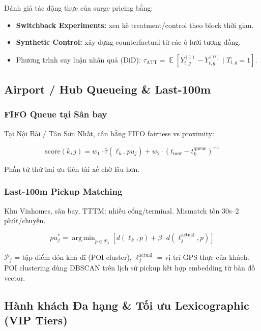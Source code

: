 \documentclass[12pt,a4paper]{article}
\DeclareMathOperator{\argmin}{arg\,min}
\DeclareMathOperator*{\E}{\mathbb{E}}
\begin{document}
Đánh giá tác động thực của surge pricing bằng:
\begin{itemize}
  \item \textbf{Switchback Experiments:} xen kẽ treatment/control theo block thời gian.
  \item \textbf{Synthetic Control:} xây dựng counterfactual từ các ô lưới tương đồng.
  \item Phương trình suy luận nhân quả (DiD):
        $\tau_{\mathrm{ATT}} = \E[Y_{t,g}^{(1)}-Y_{t,g}^{(0)}\mid T_{t,g}=1]$.
\end{itemize}

\subsection{Airport / Hub Queueing \& Last-100m}

\subsubsection{FIFO Queue tại Sân bay}

Tại Nội Bài / Tân Sơn Nhất, cân bằng FIFO fairness vs proximity:

\begin{equation}
  \text{score}(k,j) = w_1\cdot\hat{\tau}(\ell_k,pu_j)
  + w_2\cdot\left(t_{\mathrm{now}} - t_k^{\mathrm{queue}}\right)^{-1}
\end{equation}

Phần tử thứ hai ưu tiên tài xế chờ lâu hơn.

\subsubsection{Last-100m Pickup Matching}

Khu Vinhomes, sân bay, TTTM: nhiều cổng/terminal. Mismatch tốn 30s--2 phút/chuyến.

\begin{equation}
  pu_j^* = \argmin_{p\in\mathcal{P}_j}\left[
    d(\ell_k, p) + \beta\cdot d(\ell_j^{\mathrm{actual}}, p)
  \right]
\end{equation}

$\mathcal{P}_j$ = tập điểm đón khả dĩ (POI cluster), $\ell_j^{\mathrm{actual}}$
= vị trí GPS thực của khách. POI clustering dùng DBSCAN trên lịch sử pickup
kết hợp embedding từ bản đồ vector.

\subsection{Hành khách Đa hạng \& Tối ưu Lexicographic (VIP Tiers)}
\end{document}
